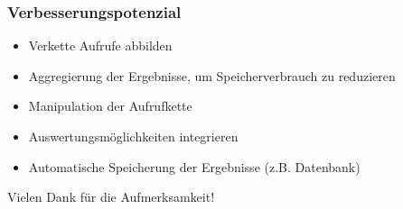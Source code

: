 \begin{frame}
\begin{columns}
\begin{column}{0.5\textwidth}
        \end{column}
    \end{columns}
       
    
    
       
    
    



\end{frame}


\begin{frame}
    \frametitle{Verbesserungspotenzial}
    \begin{itemize}
        \item Verkette Aufrufe abbilden
        \item Aggregierung der Ergebnisse, um Speicherverbrauch zu reduzieren
        \item Manipulation der Aufrufkette
        \item Auswertungsmöglichkeiten integrieren
        \item Automatische Speicherung der Ergebnisse (z.B. Datenbank)
    \end{itemize}
\end{frame}


\begin{frame}
    Vielen Dank für die Aufmerksamkeit!
\end{frame}